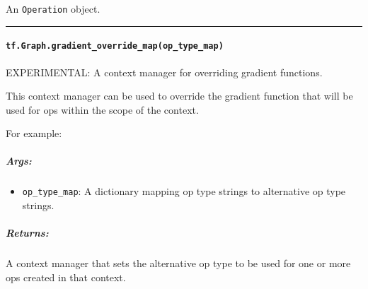 An \lstinline{Operation} object.

\begin{center}\rule{0.5\linewidth}{\linethickness}\end{center}

\paragraph{\texorpdfstring{\lstinline{tf.Graph.gradient_override_map(op_type_map)}
}{tf.Graph.gradient_override_map(op_type_map) }}\label{tf.graph.gradientux5foverrideux5fmapopux5ftypeux5fmap}

EXPERIMENTAL: A context manager for overriding gradient functions.

This context manager can be used to override the gradient function that
will be used for ops within the scope of the context.

For example:

\begin{Shaded}
\begin{Highlighting}[]
\NormalTok{(}\NormalTok{)}
 

  
  \OperatorTok{=} \NormalTok{)}
  \OperatorTok{=} 
   \NormalTok{: }\NormalTok{\}):}
    \OperatorTok{=} 
\end{Highlighting}
\end{Shaded}

\subparagraph{Args: }\label{args-11}

\begin{itemize}
\tightlist
\item
  \lstinline{op_type_map}: A dictionary mapping op type strings to
  alternative op type strings.
\end{itemize}

\subparagraph{Returns: }\label{returns-13}

A context manager that sets the alternative op type to be used for one
or more ops created in that context.

